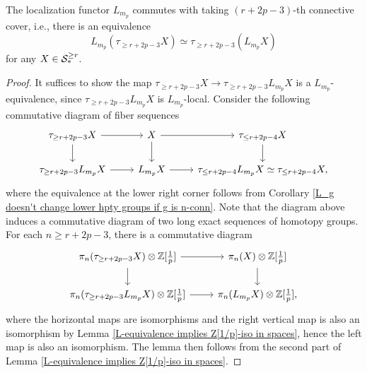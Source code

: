 \begin{lemma}
\label{m_p localization commutes with k-th connective cover}
	The localization functor $L_{m_p}$ commutes with taking $(r+2p-3)$-th connective cover, i.e., there is an equivalence
	$$
	L_{m_p}(\tau_{\geq r+2p-3}X)\simeq \tau_{\geq r+2p-3}(L_{m_p} X)
	$$
	for any $X\in {\mathcal{S}}^{\geq r}_*$.
\end{lemma}
\begin{proof}
	It suffices to show the map $\tau_{\geq r+2p-3}X\to \tau_{\geq r+2p-3}L_{m_{p}}X$ is a $L_{m_p}$-equivalence, since $\tau_{\geq r+2p-3}L_{m_{p}}X$ is $L_{m_p}$-local. Consider the following commutative diagram of fiber sequences
	\[
	\begin{tikzcd}
		\tau_{\geq r+2p-3}X & X & \tau_{\leq r+2p-4}X    \\
		\tau_{\geq r+2p-3}L_{m_p}X & L_{m_p}X & \tau_{\leq r+2p-4} L_{m_p}X\simeq \tau_{\leq r+2p-4}X,
		\arrow[from=1-1, to=1-2]
		\arrow[from=2-1, to=2-2]
		\arrow[from=1-3, to=2-3]
		\arrow[from=1-2, to=1-3]
		\arrow[from=2-2, to=2-3]
		\arrow[from=1-1, to=2-1]
		\arrow[from=1-2, to=2-2]
	\end{tikzcd}
	\]
	where the equivalence at the lower right corner follows from Corollary \ref{L_g doesn't change lower hpty groups if g is n-conn}.
	Note that the diagram above induces a commutative diagram of two long exact sequences of homotopy groups. For each $n\geq r+2p-3$, there is a commutative diagram
	\[
	\begin{tikzcd}
		\pi_{n}(\tau_{\geq r+2p-3}X)\otimes \BZ[\frac{1}{p}] & \pi_{n}(X) \otimes \BZ[\frac{1}{p}] \\
		\pi_{n}(\tau_{\geq r+2p-3}L_{m_p}X)\otimes \BZ[\frac{1}{p}]  & \pi_{n}(L_{m_p}X)\otimes \BZ[\frac{1}{p}] 
		\arrow[from=1-1, to=1-2]
		\arrow[from=2-1, to=2-2]
		\arrow[from=1-1, to=2-1]
		\arrow[from=1-2, to=2-2],
	\end{tikzcd}
	\]
	where the horizontal maps are isomorphisms and the right vertical map is also an isomorphism by Lemma \ref{L-equivalence implies Z[1/p]-iso in spaces}, hence the left map is also an isomorphism.
	The lemma then follows from the second part of Lemma \ref{L-equivalence implies Z[1/p]-iso in spaces}.
	
\end{proof}
	
